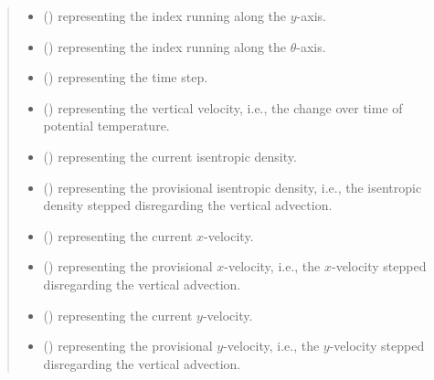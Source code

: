 \documentclass[letterpaper,10pt,english]{sphinxmanual}
\begin{document}
\begin{fulllineitems}
\begin{fulllineitems}
\begin{quote}
\begin{description}
\begin{itemize}
\item {} 
 () \textendash{}  representing the index running along the \(y\)-axis.

\item {} 
 () \textendash{}  representing the index running along the \(\theta\)-axis.

\item {} 
 () \textendash{}  representing the time step.

\item {} 
 () \textendash{}  representing the vertical velocity, i.e.,
the change over time of potential temperature.

\item {} 
 () \textendash{}  representing the current isentropic density.

\item {} 
 () \textendash{}  representing the provisional isentropic density, i.e.,
the isentropic density stepped disregarding the vertical advection.

\item {} 
 () \textendash{}  representing the current \(x\)-velocity.

\item {} 
 () \textendash{}  representing the provisional \(x\)-velocity, i.e.,
the \(x\)-velocity stepped disregarding the vertical advection.

\item {} 
 () \textendash{}  representing the current \(y\)-velocity.

\item {} 
 () \textendash{}  representing the provisional \(y\)-velocity, i.e.,
the \(y\)-velocity stepped disregarding the vertical advection.


\end{itemize}
\end{description}
\end{quote}
\end{fulllineitems}
\end{fulllineitems}
\end{document}
